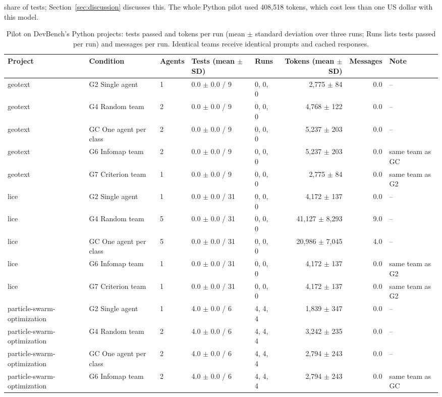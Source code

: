 share of tests; Section~\ref{sec:discussion} discusses this. The whole Python pilot used 408,518 tokens, which cost less than one US dollar with this model.

\begin{table}[t]\centering\small
\caption{Pilot on DevBench's Python projects: tests passed and tokens per run (mean $\pm$ standard deviation over three runs; Runs lists tests passed per run) and messages per run. Identical teams receive identical prompts and cached responses.}\label{tab:pilot}
\begin{tabular}{lllllrrl}\toprule
Project & Condition & Agents & Tests (mean $\pm$ SD) & Runs & Tokens (mean $\pm$ SD) & Messages & Note\\\midrule
geotext & G2 Single agent & 1 & 0.0 $\pm$ 0.0 / 9 & 0, 0, 0 & 2,775 $\pm$ 84 & 0.0 & --\\
geotext & G4 Random team & 2 & 0.0 $\pm$ 0.0 / 9 & 0, 0, 0 & 4,768 $\pm$ 122 & 0.0 & --\\
geotext & GC One agent per class & 2 & 0.0 $\pm$ 0.0 / 9 & 0, 0, 0 & 5,237 $\pm$ 203 & 0.0 & --\\
geotext & G6 Infomap team & 2 & 0.0 $\pm$ 0.0 / 9 & 0, 0, 0 & 5,237 $\pm$ 203 & 0.0 & same team as GC\\
geotext & G7 Criterion team & 1 & 0.0 $\pm$ 0.0 / 9 & 0, 0, 0 & 2,775 $\pm$ 84 & 0.0 & same team as G2\\
lice & G2 Single agent & 1 & 0.0 $\pm$ 0.0 / 31 & 0, 0, 0 & 4,172 $\pm$ 137 & 0.0 & --\\
lice & G4 Random team & 5 & 0.0 $\pm$ 0.0 / 31 & 0, 0, 0 & 41,127 $\pm$ 8,293 & 9.0 & --\\
lice & GC One agent per class & 5 & 0.0 $\pm$ 0.0 / 31 & 0, 0, 0 & 20,986 $\pm$ 7,045 & 4.0 & --\\
lice & G6 Infomap team & 1 & 0.0 $\pm$ 0.0 / 31 & 0, 0, 0 & 4,172 $\pm$ 137 & 0.0 & same team as G2\\
lice & G7 Criterion team & 1 & 0.0 $\pm$ 0.0 / 31 & 0, 0, 0 & 4,172 $\pm$ 137 & 0.0 & same team as G2\\
particle-swarm-optimization & G2 Single agent & 1 & 4.0 $\pm$ 0.0 / 6 & 4, 4, 4 & 1,839 $\pm$ 347 & 0.0 & --\\
particle-swarm-optimization & G4 Random team & 2 & 4.0 $\pm$ 0.0 / 6 & 4, 4, 4 & 3,242 $\pm$ 235 & 0.0 & --\\
particle-swarm-optimization & GC One agent per class & 2 & 4.0 $\pm$ 0.0 / 6 & 4, 4, 4 & 2,794 $\pm$ 243 & 0.0 & --\\
particle-swarm-optimization & G6 Infomap team & 2 & 4.0 $\pm$ 0.0 / 6 & 4, 4, 4 & 2,794 $\pm$ 243 & 0.0 & same team as GC\\

\end{tabular}
\end{table}
